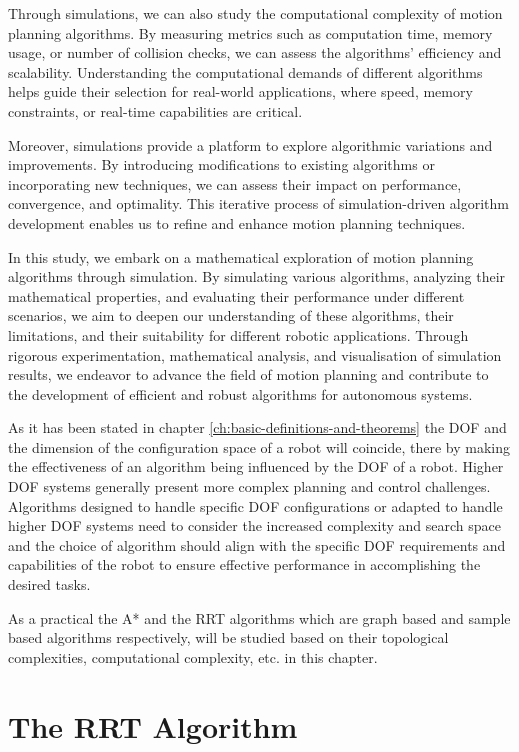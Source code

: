 Through simulations, we can also study the computational complexity of motion planning algorithms.
By measuring metrics such as computation time, memory usage, or number of collision checks, we can assess the algorithms' efficiency and scalability. Understanding the computational demands of different algorithms helps guide their selection for real-world applications, where speed, memory constraints, or real-time capabilities are critical.

Moreover, simulations provide a platform to explore algorithmic variations and improvements.
By introducing modifications to existing algorithms or incorporating new techniques, we can assess their impact on performance, convergence, and optimality.
This iterative process of simulation-driven algorithm development enables us to refine and enhance motion planning techniques.

In this study, we embark on a mathematical exploration of motion planning algorithms through simulation. By simulating various algorithms, analyzing their mathematical properties, and evaluating their performance under different scenarios, we aim to deepen our understanding of these algorithms, their limitations, and their suitability for different robotic applications.
Through rigorous experimentation, mathematical analysis, and visualisation of simulation results, we endeavor to advance the field of motion planning and contribute to the development of efficient and robust algorithms for autonomous systems.

As it has been stated in chapter \ref{ch:basic-definitions-and-theorems} the DOF and the dimension of the configuration space of a robot will coincide, there by making the effectiveness of an algorithm being influenced by the DOF of a robot.
Higher DOF systems generally present more complex planning and control challenges.
Algorithms designed to handle specific DOF configurations or adapted to handle higher DOF systems need to consider the increased complexity and search space and the choice of algorithm should align with the specific DOF requirements and capabilities of the robot to ensure effective performance in accomplishing the desired tasks.

As a practical the A* and the RRT algorithms which are graph based and sample based algorithms respectively, will be studied based on their topological complexities, computational complexity, etc. in this chapter.

\section{The RRT Algorithm}

